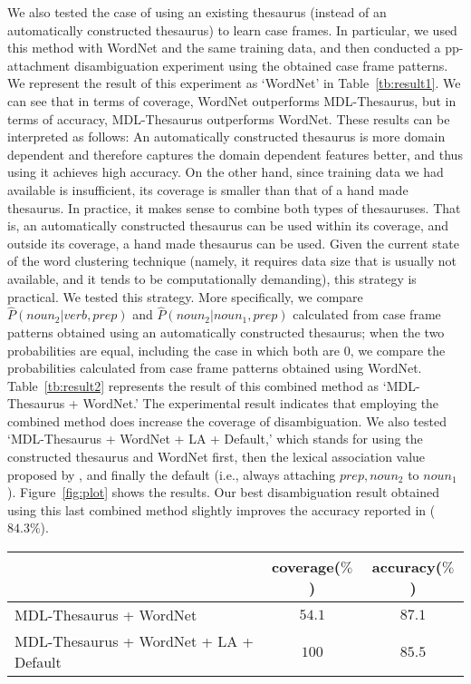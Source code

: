 We also tested the case of using an existing thesaurus (instead of an
automatically constructed thesaurus) to learn case frames. In
particular, we used this method with WordNet \cite{Miller93} and the
same training data, and then conducted a pp-attachment disambiguation
experiment using the obtained case frame patterns. We represent the
result of this experiment as `WordNet' in Table~\ref{tb:result1}. We
can see that in terms of coverage, WordNet outperforms MDL-Thesaurus,
but in terms of accuracy, MDL-Thesaurus outperforms WordNet. These
results can be interpreted as follows: An automatically constructed
thesaurus is more domain dependent and therefore captures the domain
dependent features better, and thus using it achieves high accuracy.
On the other hand, since training data we had available is
insufficient, its coverage is smaller than that of a hand made
thesaurus. In practice, it makes sense to combine both types of
thesauruses. That is, an automatically constructed thesaurus can be
used within its coverage, and outside its coverage, a hand made
thesaurus can be used. Given the current state of the word clustering
technique (namely, it requires data size that is usually not
available, and it tends to be computationally demanding), this
strategy is practical. We tested this strategy. More specifically, we
compare $\hat{P}(noun_2|verb,prep)$ and $\hat{P}(noun_2|noun_1,prep)$
calculated from case frame patterns obtained using an automatically
constructed thesaurus; when the two probabilities are equal, including
the case in which both are $0$, we compare the probabilities
calculated from case frame patterns obtained using WordNet. 
Table~\ref{tb:result2} represents the result of this combined method
as `MDL-Thesaurus + WordNet.' The experimental result indicates that
employing the combined method does increase the coverage of
disambiguation. We also tested `MDL-Thesaurus + WordNet + LA +
Default,' which stands for using the constructed thesaurus and WordNet
first, then the lexical association value proposed by \cite{Hindle91},
and finally the default (i.e., always attaching $prep, noun_2$ to
$noun_1$). Figure~\ref{fig:plot} shows the results. Our best
disambiguation result obtained using this last combined method
slightly improves the accuracy reported in \cite{Li95} ($84.3\%$).
\begin{table*}[htb]
\caption{PP-attachment disambiguation results}
\label{tb:result2}
\begin{center}
\begin{tabular}{|l|c|c|} \hline
 & coverage($\%$) & accuracy($\%$) \\ \hline
MDL-Thesaurus + WordNet & $54.1$ & $87.1$ \\ 
MDL-Thesaurus + WordNet + LA + Default & $100$ & $85.5$ \\ \hline
\end{tabular}
\end{center}
\end{table*}

